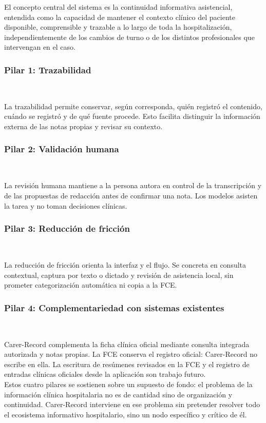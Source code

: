 El concepto central del sistema es la continuidad informativa asistencial, entendida como la capacidad de mantener el contexto clínico del paciente disponible, comprensible y trazable a lo largo de toda la hospitalización, independientemente de los cambios de turno o de los distintos profesionales que intervengan en el caso.\\

\subsubsection*{Pilar 1: Trazabilidad} ~

La trazabilidad permite conservar, según corresponda, quién registró el contenido, cuándo se registró y de qué fuente procede. Esto facilita distinguir la información externa de las notas propias y revisar su contexto.\\

\subsubsection*{Pilar 2: Validación humana} ~

La revisión humana mantiene a la persona autora en control de la transcripción y de las propuestas de redacción antes de confirmar una nota. Los modelos asisten la tarea y no toman decisiones clínicas.\\

\subsubsection*{Pilar 3: Reducción de fricción} ~

La reducción de fricción orienta la interfaz y el flujo. Se concreta en consulta contextual, captura por texto o dictado y revisión de asistencia local, sin prometer categorización automática ni copia a la FCE.\\

\subsubsection*{Pilar 4: Complementariedad con sistemas existentes} ~

Carer-Record complementa la ficha clínica oficial mediante consulta integrada autorizada y notas propias. La FCE conserva el registro oficial: Carer-Record no escribe en ella. La escritura de resúmenes revisados en la FCE y el registro de entradas clínicas oficiales desde la aplicación son trabajo futuro.\\

Estos cuatro pilares se sostienen sobre un supuesto de fondo: el problema de la información clínica hospitalaria no es de cantidad sino de organización y continuidad. Carer-Record interviene en ese problema sin pretender resolver todo el ecosistema informativo hospitalario, sino un nodo específico y crítico de él.\\
